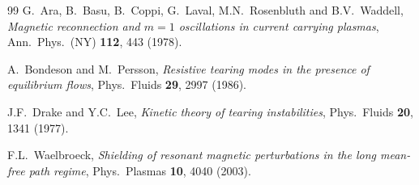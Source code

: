 \documentclass[12pt,prb,aps]{revtex4-1}
\begin{document}
\begin{thebibliography}{99}
 G.~Ara, B.~Basu, B.~Coppi, G.~Laval, M.N.~Rosenbluth and B.V.~Waddell, {\em Magnetic reconnection and $m = 1$ oscillations in current carrying plasmas}, Ann.\ Phys.\ (NY) {\bf 112}, 443 (1978).

 A.~Bondeson and M.~Persson, {\em Resistive tearing modes in the presence of equilibrium flows}, Phys.\ Fluids {\bf 29}, 2997 (1986).

 J.F.~Drake and Y.C.~Lee,  {\em Kinetic theory of tearing instabilities}, Phys.\ Fluids {\bf 20}, 1341 (1977).

 F.L.~Waelbroeck, {\em Shielding of resonant magnetic perturbations in the long mean-free path regime}, Phys.\ Plasmas {\bf 10}, 4040 (2003).

\end{thebibliography}
\end{document}
